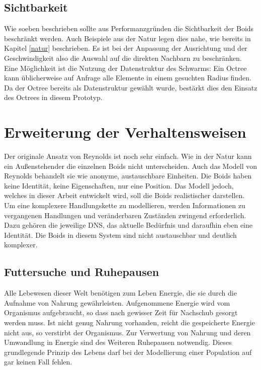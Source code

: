\documentclass[draft=false
              ,paper=a4
              ,twoside=false
              ,fontsize=11pt
              ,headsepline
              ,BCOR10mm
              ,DIV11
              ,bibtotoc
              ,liststotoc
              ]{scrbook}
\begin{document}
\subsection{Sichtbarkeit}
Wie soeben beschrieben sollte aus Performanzgründen die Sichtbarkeit der Boids beschränkt werden. Auch Beispiele aus der Natur legen dies nahe, wie bereits in Kapitel \ref{natur} beschrieben. Es ist bei der Anpassung der Ausrichtung und der Geschwindigkeit also die Auswahl auf die direkten Nachbarn zu beschränken. Eine Möglichkeit ist die Nutzung der Datenstruktur des Schwarms: Ein Octree kann üblicherweise auf Anfrage alle Elemente in einem gesuchten Radius finden. Da der Octree bereits als Datenstruktur gewählt wurde, bestärkt dies den Einsatz des Octrees in diesem Prototyp.
\section{Erweiterung der Verhaltensweisen}
Der originale Ansatz von Reynolds ist noch sehr einfach. Wie in der Natur kann ein Außenstehender die einzelnen Boids nicht unterscheiden. Auch das Modell von Reynolds behandelt sie wie anonyme, austauschbare Einheiten. Die Boids haben keine Identität, keine Eigenschaften, nur eine Position. Das Modell jedoch, welches in dieser Arbeit entwickelt wird, soll die Boids realistischer darstellen. Um eine komplexere Handlungskette zu modellieren, werden Informationen zu vergangenen Handlungen und veränderbaren Zuständen zwingend erforderlich. Dazu gehören die jeweilige DNS, das aktuelle Bedürfnis und daraufhin eben eine Identität. Die Boids in diesem System sind nicht austauschbar und deutlich komplexer.
\subsection{Futtersuche und Ruhepausen}
Alle Lebewesen dieser Welt benötigen zum Leben Energie, die sie durch die Aufnahme von Nahrung gewährleisten. Aufgenommene Energie wird vom Organismus aufgebraucht, so dass nach gewisser Zeit für Nachschub gesorgt werden muss. Ist nicht genug Nahrung vorhanden, reicht die gespeicherte Energie nicht aus, so verstirbt der Organismus. Zur Verwertung von Nahrung und deren Umwandlung in Energie sind des Weiteren Ruhepausen notwendig. Dieses grundlegende Prinzip des Lebens darf bei der Modellierung einer Population auf gar keinen Fall fehlen.
\end{document}
